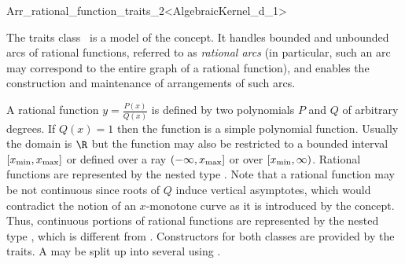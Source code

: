 
\ccRefPageBegin
\begin{ccRefClass}{Arr_rational_function_traits_2<AlgebraicKernel_d_1>}

\ccDefinition

The traits class \ccRefName\ is a model of the 
concept. It handles bounded and unbounded arcs of rational functions,
referred to as {\sl rational arcs} (in particular, such an arc may
correspond to the entire graph of a rational function), and enables the
construction and maintenance of arrangements of such arcs. 

A rational function $y = \frac{P(x)}{Q(x)}$ is defined by two polynomials 
$P$ and $Q$ of arbitrary degrees. 
If $Q(x) = 1$ then the function is a simple polynomial function.
Usually the domain is $\R$ but the function may also be 
restricted to a bounded interval $[x_{\rm min}, x_{\rm max}]$ 
or defined over a ray $(-\infty, x_{\rm max}]$ or over $[x_{\rm min}, \infty)$. 
Rational functions are represented by the nested type . 
Note that a rational function may be not continuous since roots of $Q$ induce 
vertical asymptotes, which would contradict the notion of an $x$-monotone curve as 
it is introduced by the  concept. 
Thus, continuous portions of rational functions are represented by the nested 
type , which is different from .
Constructors for both classes are provided by the traits. 
A  may be split up into several 
using . 



\end{ccRefClass}
